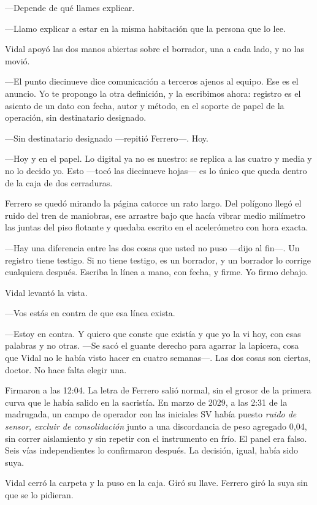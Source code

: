 ---Depende de qué llames explicar.

---Llamo explicar a estar en la misma habitación que la persona que lo lee.

Vidal apoyó las dos manos abiertas sobre el borrador, una a cada lado, y no las movió.

---El punto diecinueve dice comunicación a terceros ajenos al equipo. Ese es el anuncio. Yo te propongo la otra definición, y la escribimos ahora: registro es el asiento de un dato con fecha, autor y método, en el soporte de papel de la operación, sin destinatario designado.

---Sin destinatario designado ---repitió Ferrero---. Hoy.

---Hoy y en el papel. Lo digital ya no es nuestro: se replica a las cuatro y media y no lo decido yo. Esto ---tocó las diecinueve hojas--- es lo único que queda dentro de la caja de dos cerraduras.

Ferrero se quedó mirando la página catorce un rato largo. Del polígono llegó el ruido del tren de maniobras, ese arrastre bajo que hacía vibrar medio milímetro las juntas del piso flotante y quedaba escrito en el acelerómetro con hora exacta.

---Hay una diferencia entre las dos cosas que usted no puso ---dijo al fin---. Un registro tiene testigo. Si no tiene testigo, es un borrador, y un borrador lo corrige cualquiera después. Escriba la línea a mano, con fecha, y firme. Yo firmo debajo.

Vidal levantó la vista.

---Vos estás en contra de que esa línea exista.

---Estoy en contra. Y quiero que conste que existía y que yo la vi hoy, con esas palabras y no otras. ---Se sacó el guante derecho para agarrar la lapicera, cosa que Vidal no le había visto hacer en cuatro semanas---. Las dos cosas son ciertas, doctor. No hace falta elegir una.

Firmaron a las 12:04. La letra de Ferrero salió normal, sin el grosor de la primera curva que le había salido en la sacristía. En marzo de 2029, a las 2:31 de la madrugada, un campo de operador con las iniciales SV había puesto \textit{ruido de sensor, excluir de consolidación} junto a una discordancia de peso agregado 0,04, sin correr aislamiento y sin repetir con el instrumento en frío. El panel era falso. Seis vías independientes lo confirmaron después. La decisión, igual, había sido suya.

Vidal cerró la carpeta y la puso en la caja. Giró su llave. Ferrero giró la suya sin que se lo pidieran.

